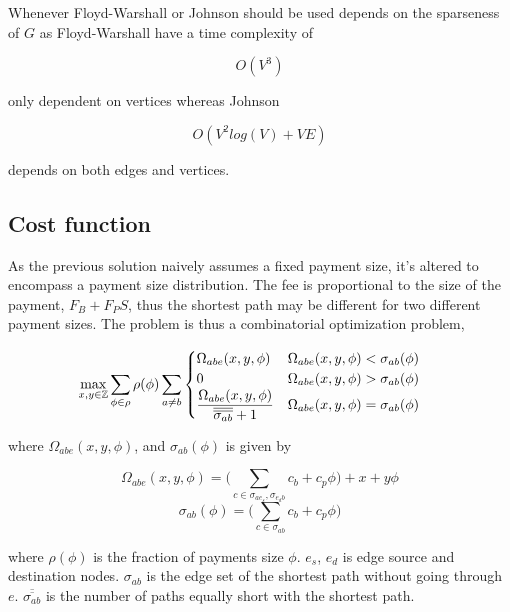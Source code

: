 Whenever Floyd-Warshall or Johnson should be used depends on the sparseness of $G$ as Floyd-Warshall have a time complexity of

\[ O(V^3) \]

only dependent on vertices whereas Johnson

\[ O(V^2 log(V) + VE ) \]

depends on both edges and vertices. 

\subsection{Cost function}

As the previous solution naively assumes a fixed payment size, it's altered to encompass a payment size distribution.
The fee is proportional to the size of the payment, $F_B + F_P S$, thus the shortest \gls{path} may be different for two different payment sizes. 
The problem is thus a combinatorial optimization problem,

\begin{equation*}
\hspace*{-0.5cm}	\max_{ x,y \in \mathbb{Z} } \sum_{\phi\in \rho} \rho(\phi) \sum_{a \neq b}
	\begin{cases}
	\Omega_{abe}(x, y, \phi) & \Omega_{abe}(x, y, \phi) < \sigma_{ab}(\phi)  \\
	0 & \Omega_{abe}(x, y, \phi) > \sigma_{ab}(\phi) \\
	\dfrac{\Omega_{abe}(x, y, \phi)}{\overline{\overline{\sigma_{ab}}} + 1} & \Omega_{abe}(x, y, \phi) = \sigma_{ab}(\phi)  \\
	\end{cases}
\end{equation*}

where $\Omega_{abe}(x, y, \phi)$, and $\sigma_{ab}(\phi)$ is given by

\begin{equation*}	
	\Omega_{abe}(x, y, \phi) = \Bigg( \sum_{c \in \sigma_{ae_s},\sigma_{e_db}} c_b + c_p\phi \Bigg) +
	x + y\phi 
\end{equation*}
\begin{equation*}
	\sigma_{ab}(\phi) = \Bigg( \sum_{c \in \sigma_{ab}} c_b + c_p\phi \Bigg)
\end{equation*}

where $\rho(\phi)$ is the fraction of payments size $\phi$. $e_s$, $e_d$ is edge source and destination \gls{node}s. $\sigma_{ab}$ is the edge set of the shortest path without going through $e$. $\overline{\overline{\sigma_{ab}}}$ is the number of paths equally short with the shortest \gls{path}.

